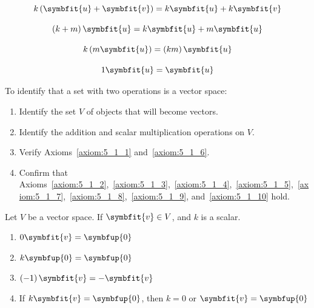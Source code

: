 \documentclass{article}
\begin{document}
\begin{axiom}
    \begin{equation*} \label{axiom:5_1_7}
        k \left(\symbfit{u} + \symbfit{v}\right) = k\symbfit{u} + k\symbfit{v}
    \end{equation*}
\end{axiom}
\begin{axiom}
    \begin{equation*}\label{axiom:5_1_8}
        \left(k+m\right)\symbfit{u} = k\symbfit{u} + m\symbfit{u}
    \end{equation*}
\end{axiom}
\begin{axiom}
    \begin{equation*}\label{axiom:5_1_9}
        k\left(m\symbfit{u}\right)=\left(km\right)\symbfit{u}
    \end{equation*}
\end{axiom}
\begin{axiom}
    \begin{equation*}\label{axiom:5_1_10}
        1 \symbfit{u}=\symbfit{u}
    \end{equation*}
\end{axiom}
\noindent To identify that a set with two operations is a vector space:
\begin{enumerate}
    \item Identify the set \(V\) of objects that will become vectors.
    \item Identify the addition and scalar multiplication operations on
          \(V\).
    \item Verify Axioms~\ref{axiom:5_1_1} and~\ref{axiom:5_1_6}.
    \item Confirm that Axioms~\ref{axiom:5_1_2},~\ref{axiom:5_1_3},~\ref{axiom:5_1_4},~\ref{axiom:5_1_5},~\ref{axiom:5_1_7},~\ref{axiom:5_1_8},~\ref{axiom:5_1_9}, and~\ref{axiom:5_1_10} hold.
\end{enumerate}
\begin{theorem}
    Let \(V\) be a vector space. If \(\symbfit{v} \in V\), and \(k\) is
    a scalar.
    \begin{enumerate}
        \item \(0\symbfit{v}=\symbfup{0}\)
        \item \(k\symbfup{0}=\symbfup{0}\)
        \item \(\left(-1\right)\symbfit{v}=-\symbfit{v}\)
        \item If \(k\symbfit{v}=\symbfup{0}\), then \(k=0\) or
              \(\symbfit{v}=\symbfup{0}\)
    \end{enumerate}
\end{theorem}
\end{document}
